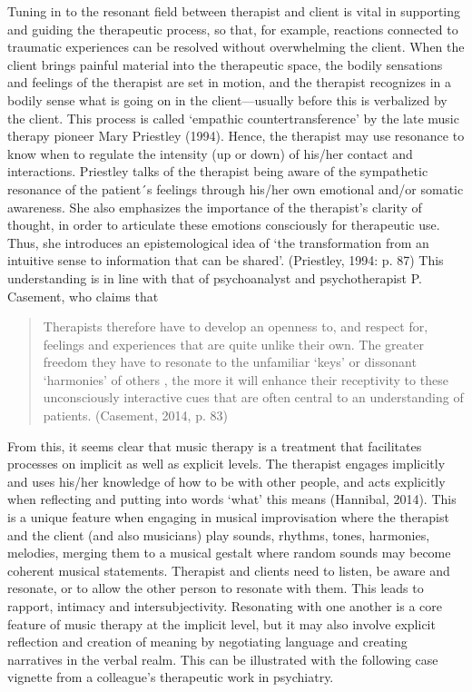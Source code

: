 \begin{adjmulticols}{2}{0mm}{0mm}
Tuning in to the resonant field between therapist and client is vital in supporting and guiding the therapeutic process, so that, for example, reactions connected to traumatic experiences can be resolved without overwhelming the client. When the client brings painful material into the therapeutic space, the bodily sensations and feelings of the therapist are set in motion, and the therapist recognizes in a bodily sense what is going on in the client—usually before this is verbalized by the client. This process is called ‘empathic countertransference’ by the late music therapy pioneer Mary Priestley (1994). Hence, the therapist may use resonance to know when to regulate the intensity (up or down) of his/her contact and interactions. Priestley talks of the therapist being aware of the sympathetic resonance of the patient´s feelings through his/her own emotional and/or somatic awareness. She also emphasizes the importance of the therapist’s clarity of thought, in order to articulate these emotions consciously for therapeutic use.  Thus, she introduces an epistemological idea of ‘the transformation from an intuitive sense to information that can be shared’. (Priestley, 1994: p. 87) This understanding is in line with that of psychoanalyst and psychotherapist P. Casement, who claims that 
    \blockquote{Therapists therefore have to develop an openness to, and respect for, feelings and experiences that are quite unlike their own. The greater freedom they  have to resonate to the unfamiliar  ‘keys’ or dissonant ‘harmonies’ of  others , the more it will enhance their receptivity to these unconsciously  interactive cues that are often  central to an understanding of  patients. (Casement, 2014, p. 83)}
From this, it seems clear that music therapy is a treatment that facilitates processes on implicit as well as explicit levels. The therapist engages implicitly and uses his/her knowledge of how to be with other people, and acts explicitly when reflecting and putting into words ‘what’ this means (Hannibal, 2014). This is a unique feature when engaging in musical improvisation where the therapist and the client (and also musicians) play sounds, rhythms, tones, harmonies, melodies, merging them to a musical gestalt where random sounds may become coherent musical statements. Therapist and clients need to listen, be aware and resonate, or to allow the other person to resonate with them. This leads to rapport, intimacy and intersubjectivity. Resonating with one another is a core feature of music therapy at the implicit level, but it may also involve explicit reflection and creation of meaning by negotiating language and creating narratives in the verbal realm. This can be illustrated with the following case vignette from a colleague’s therapeutic work in psychiatry.

\end{adjmulticols}
